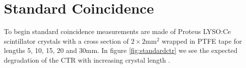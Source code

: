 \section{Standard Coincidence}
To begin standard coincidence measurements are made of Proteus LYSO:Ce scintillator crystals with a cross section of $2\times2$mm$^2$ wrapped in PTFE tape for lengths 5, 10, 15, 20 and 30mm. In figure \ref{fig:standardctr} we see the expected degradation of the CTR with increasing crystal length \cite{Wiener_Kaul_Surti_Karp_2010}\cite{Choong_2009}\cite{Gola_Piemonte_Tarolli_2013}\cite{o_Pro_Serra_Tarolli_Zorzi_2011}.